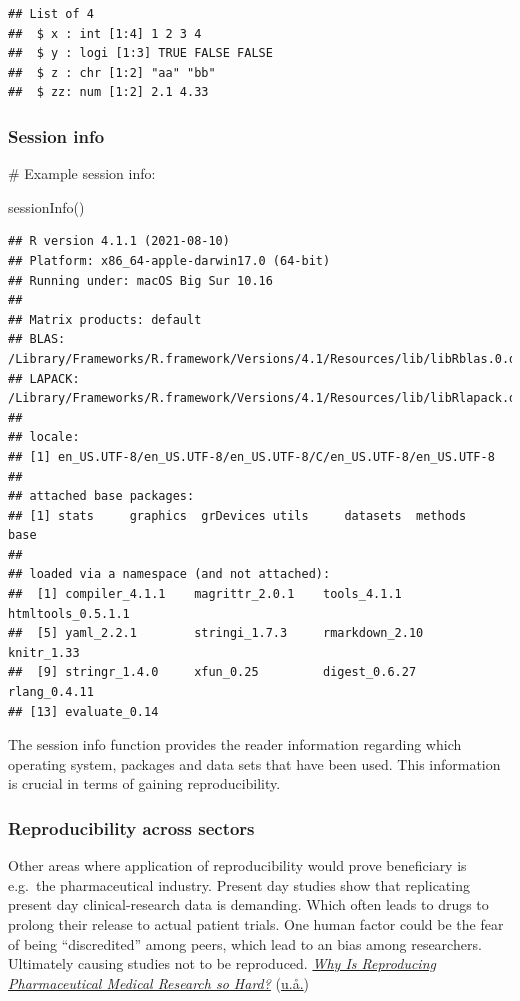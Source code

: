 \documentclass[
  12pt,
  norsk,
]{article}
\newenvironment{Shaded}{\begin{snugshade}}{\end{snugshade}}
\newcommand{\FunctionTok}[1]{\textcolor[rgb]{0.00,0.00,0.00}{#1}}
\newcommand{\NormalTok}[1]{#1}
\begin{document}
\begin{verbatim}
## List of 4
##  $ x : int [1:4] 1 2 3 4
##  $ y : logi [1:3] TRUE FALSE FALSE
##  $ z : chr [1:2] "aa" "bb"
##  $ zz: num [1:2] 2.1 4.33
\end{verbatim}

\hypertarget{session-info}{%
\subsubsection{Session info}\label{session-info}}

\# Example session info:

\begin{Shaded}
\begin{Highlighting}[]
\FunctionTok{sessionInfo}\NormalTok{()}
\end{Highlighting}
\end{Shaded}

\begin{verbatim}
## R version 4.1.1 (2021-08-10)
## Platform: x86_64-apple-darwin17.0 (64-bit)
## Running under: macOS Big Sur 10.16
## 
## Matrix products: default
## BLAS:   /Library/Frameworks/R.framework/Versions/4.1/Resources/lib/libRblas.0.dylib
## LAPACK: /Library/Frameworks/R.framework/Versions/4.1/Resources/lib/libRlapack.dylib
## 
## locale:
## [1] en_US.UTF-8/en_US.UTF-8/en_US.UTF-8/C/en_US.UTF-8/en_US.UTF-8
## 
## attached base packages:
## [1] stats     graphics  grDevices utils     datasets  methods   base     
## 
## loaded via a namespace (and not attached):
##  [1] compiler_4.1.1    magrittr_2.0.1    tools_4.1.1       htmltools_0.5.1.1
##  [5] yaml_2.2.1        stringi_1.7.3     rmarkdown_2.10    knitr_1.33       
##  [9] stringr_1.4.0     xfun_0.25         digest_0.6.27     rlang_0.4.11     
## [13] evaluate_0.14
\end{verbatim}

The session info function provides the reader information regarding
which operating system, packages and data sets that have been used. This
information is crucial in terms of gaining reproducibility.

\hypertarget{reproducibility-across-sectors}{%
\subsubsection{Reproducibility across
sectors}\label{reproducibility-across-sectors}}

Other areas where application of reproducibility would prove beneficiary
is e.g.~the pharmaceutical industry. Present day studies show that
replicating present day clinical-research data is demanding. Which often
leads to drugs to prolong their release to actual patient trials. One
human factor could be the fear of being ``discredited'' among peers,
which lead to an bias among researchers. Ultimately causing studies not
to be reproduced. \protect\hyperlink{ref-Pharm-tech}{\emph{Why Is
Reproducing Pharmaceutical Medical Research so Hard?}}
(\protect\hyperlink{ref-Pharm-tech}{u.å.})
\end{document}
